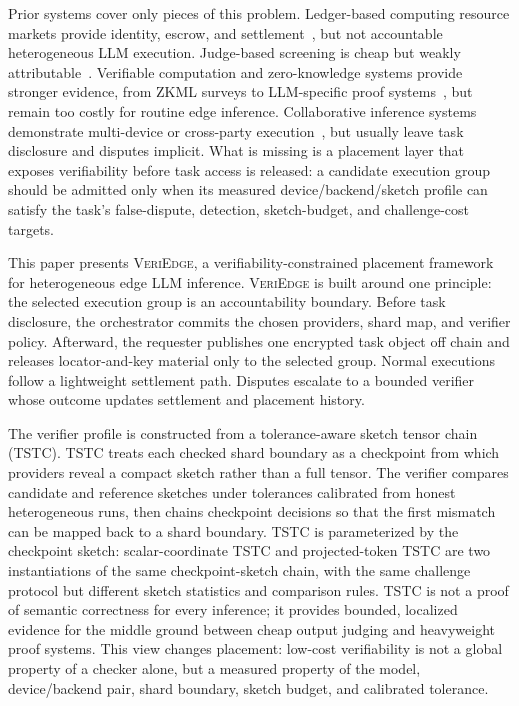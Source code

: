 \documentclass[sigplan,screen,review,anonymous]{acmart}
\newcommand{\system}{\textsc{VeriEdge}\xspace}
\begin{document}
Prior systems cover only pieces of this problem. Ledger-based computing
resource markets provide identity, escrow, and
settlement~\cite{baranwal2024blockchain,li2023double,habiba2024auction},
but not accountable heterogeneous LLM execution. Judge-based screening is
cheap but weakly attributable~\cite{zheng2023judging,liu2025polylink}.
Verifiable computation and zero-knowledge systems provide stronger evidence,
from ZKML surveys to LLM-specific proof systems~\cite{peng2025survey,
	sun2024zkllm}, but remain too costly for routine edge inference.
Collaborative inference systems demonstrate multi-device or cross-party
execution~\cite{borzunov2023petals,exo_github}, but usually leave task
disclosure and disputes implicit. What is missing is a placement layer that
exposes verifiability before task access is released: a candidate execution
group should be admitted only when its measured device/backend/sketch profile
can satisfy the task's false-dispute, detection, sketch-budget, and
challenge-cost targets.

This paper presents \system, a verifiability-constrained placement framework
for heterogeneous edge LLM inference. \system is built around one principle:
the selected execution group is an accountability boundary. Before task
disclosure, the orchestrator commits the chosen providers, shard map, and
verifier policy. Afterward, the requester publishes one encrypted
task object off chain and releases locator-and-key material only to the
selected group. Normal executions follow a lightweight settlement path.
Disputes escalate to a bounded verifier whose outcome updates settlement and
placement history.

The verifier profile is constructed from a tolerance-aware sketch tensor chain
(TSTC). TSTC treats each checked shard boundary as a checkpoint from which
providers reveal a compact sketch rather than a full tensor. The verifier
compares candidate and reference sketches under tolerances calibrated from
honest heterogeneous runs, then chains checkpoint decisions so that the first
mismatch can be mapped back to a shard boundary. TSTC is parameterized by the
checkpoint sketch: scalar-coordinate TSTC and projected-token TSTC are two
instantiations of the same checkpoint-sketch chain, with the same challenge
protocol but different sketch statistics and comparison rules. TSTC is not a
proof of semantic correctness for every inference; it provides bounded,
localized evidence for the middle ground between cheap output judging and
heavyweight proof systems. This view changes placement: low-cost
verifiability is not a global property of a checker alone, but a measured
property of the model, device/backend pair, shard boundary, sketch budget, and
calibrated tolerance.
\end{document}

